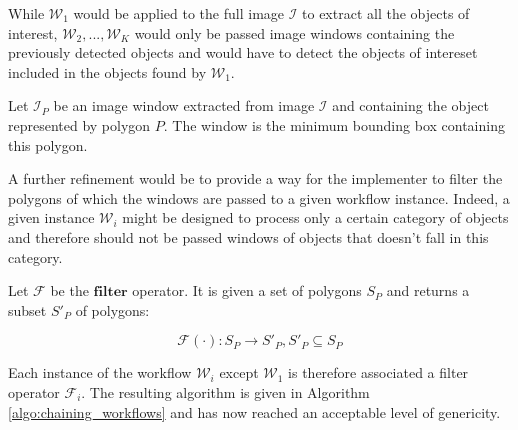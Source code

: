 While $\mathcal{W}_1$ would be applied to the full image $\mathcal{I}$ to extract all the objects of interest, $\mathcal{W}_2, ..., \mathcal{W}_K$ would only be passed image windows containing the previously detected objects and would have to detect the objects of intereset included in the objects found by $\mathcal{W}_1$. 

\begin{definition}\label{def:image_window}
	Let $\mathcal{I}_P$ be an image window extracted from image $\mathcal{I}$ and containing the object represented by polygon $P$. The window is the minimum bounding box containing this polygon.
\end{definition}

A further refinement would be to provide a way for the implementer to filter the polygons of which the windows are passed to a given workflow instance. Indeed, a given instance $\mathcal{W}_i$ might be designed to process only a certain category of objects and therefore should not be passed windows of objects that doesn't fall in this category. 

\begin{definition}\label{def:filter_op}
	Let $\mathcal{F}$ be the $\textbf{filter}$ operator. It is given a set of polygons $S_P$ and returns a subset $S'_P$ of polygons:
	
	\begin{equation}
		\mathcal{F}(\cdot): S_P \rightarrow S'_P, S'_P \subseteq S_P
	\end{equation}
\end{definition}

Each instance of the workflow $\mathcal{W}_i$ except $\mathcal{W}_1$ is therefore associated a filter operator $\mathcal{F}_i$. The resulting algorithm is given in Algorithm \ref{algo:chaining_workflows} and has now reached an acceptable level of genericity.

